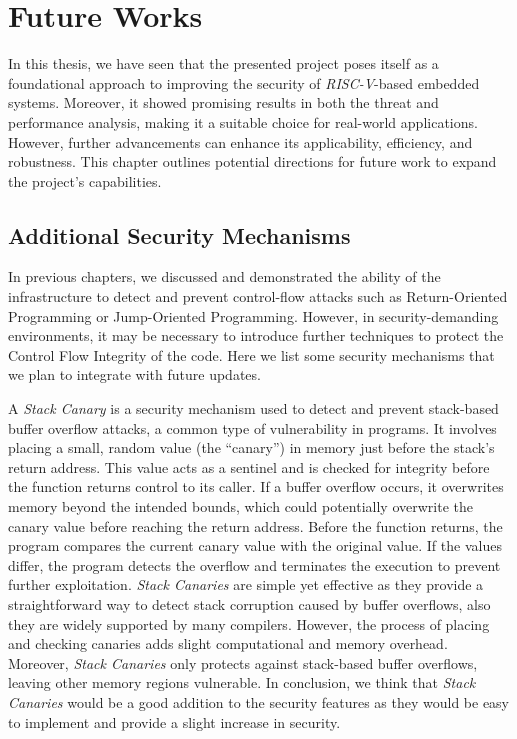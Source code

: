 \chapter{Future Works}
\label{cha:future}

In this thesis, we have seen that the presented project poses itself as a foundational
approach to improving the security of \textit{RISC-V}-based embedded systems. Moreover,
it showed promising results in both the threat and performance analysis, making it
a suitable choice for real-world applications. However, further advancements can
enhance its applicability, efficiency, and robustness. This chapter outlines
potential directions for future work to expand the project's capabilities.

\section{Additional Security Mechanisms}
\label{sec:future_security}

In previous chapters, we discussed and demonstrated the ability of the
infrastructure to detect and prevent control-flow attacks such as Return-Oriented
Programming or Jump-Oriented Programming. However, in security-demanding
environments, it may be necessary to introduce further techniques to protect the
Control Flow Integrity of the code. Here we list some security mechanisms that
we plan to integrate with future updates.

A \textit{Stack Canary} is a security mechanism used to detect and prevent stack-based
buffer overflow attacks, a common type of vulnerability in programs. It involves
placing a small, random value (the ``canary'') in memory just before the stack's
return address. This value acts as a sentinel and is checked for integrity before
the function returns control to its caller. If a buffer overflow occurs, it overwrites
memory beyond the intended bounds, which could potentially overwrite the canary
value before reaching the return address. Before the function returns, the
program compares the current canary value with the original value. If the values
differ, the program detects the overflow and terminates the execution to prevent
further exploitation. \textit{Stack Canaries} are simple yet effective as they
provide a straightforward way to detect stack corruption caused by buffer
overflows, also they are widely supported by many compilers. However, the process
of placing and checking canaries adds slight computational and memory overhead.
Moreover, \textit{Stack Canaries} only protects against stack-based buffer
overflows, leaving other memory regions vulnerable. In conclusion, we think that
\textit{Stack Canaries} would be a good addition to the security features as
they would be easy to implement and provide a slight increase in security.

